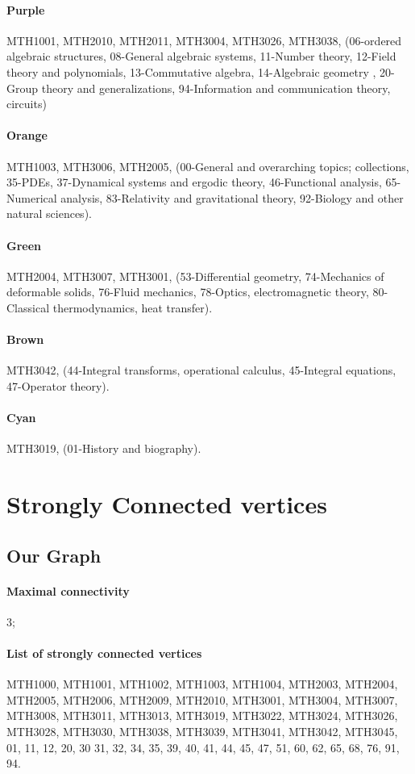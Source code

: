 \documentclass[english, 12pt]{article}
\begin{document}
\paragraph{Purple} MTH1001, MTH2010, MTH2011, MTH3004, MTH3026, MTH3038, (06-ordered algebraic structures, 08-General algebraic systems, 11-Number theory, 12-Field theory and polynomials, 13-Commutative algebra, 14-Algebraic geometry , 20-Group theory and generalizations, 94-Information and communication theory, circuits)
\paragraph{Orange} MTH1003, MTH3006, MTH2005, (00-General and overarching topics; collections, 35-PDEs, 37-Dynamical systems and ergodic theory, 46-Functional analysis, 65-Numerical analysis, 83-Relativity and gravitational theory, 92-Biology and other natural sciences).
\paragraph{Green} MTH2004, MTH3007, MTH3001, (53-Differential geometry, 74-Mechanics of deformable solids, 76-Fluid mechanics, 78-Optics, electromagnetic theory, 80-Classical thermodynamics, heat transfer).
\paragraph{Brown} MTH3042, (44-Integral transforms, operational calculus, 45-Integral equations, 47-Operator theory).
\paragraph{Cyan} MTH3019, (01-History and biography).
\parskip=0.0pt

\section{Strongly Connected vertices} \label{app:strongly_connected_vertices}
\subsection{Our Graph}
\paragraph{Maximal connectivity} 3;
\parskip=-8.0pt
\paragraph{List of strongly connected vertices} MTH1000, MTH1001, MTH1002, MTH1003, MTH1004, MTH2003, MTH2004, MTH2005, MTH2006, MTH2009, MTH2010, MTH3001, MTH3004, MTH3007, MTH3008, MTH3011, MTH3013, MTH3019, MTH3022, MTH3024, MTH3026, MTH3028, MTH3030, MTH3038, MTH3039, MTH3041, MTH3042, MTH3045, 01, 11, 12, 20, 30 31, 32, 34, 35, 39, 40, 41, 44, 45, 47, 51, 60, 62, 65, 68, 76, 91, 94.
\parskip=0.0pt
\end{document}
